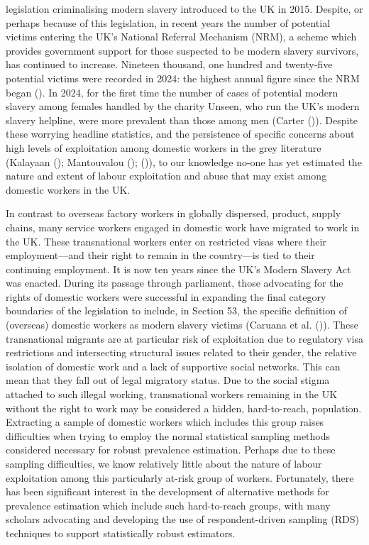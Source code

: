 \documentclass[
  12pt,
]{article}
\theoremstyle{plain}
\theoremstyle{definition}
\begin{document}
legislation criminalising modern slavery introduced to the UK in 2015.
Despite, or perhaps because of this legislation, in recent years the
number of potential victims entering the UK's National Referral
Mechanism (NRM), a scheme which provides government support for those
suspected to be modern slavery survivors, has continued to increase.
Nineteen thousand, one hundred and twenty-five potential victims were
recorded in 2024: the highest annual figure since the NRM began
(). In 2024, for the
first time the number of cases of potential modern slavery among females
handled by the charity Unseen, who run the UK's modern slavery helpline,
were more prevalent than those among men (Carter
()). Despite these worrying
headline statistics, and the persistence of specific concerns about high
levels of exploitation among domestic workers in the grey literature
(Kalayaan (); Mantouvalou
();
()), to our knowledge
no-one has yet estimated the nature and extent of labour exploitation
and abuse that may exist among domestic workers in the UK.

In contrast to overseas factory workers in globally dispersed, product,
supply chains, many service workers engaged in domestic work have
migrated to work in the UK. These transnational workers enter on
restricted visas where their employment---and their right to remain in
the country---is tied to their continuing employment. It is now ten
years since the UK's Modern Slavery Act was enacted. During its passage
through parliament, those advocating for the rights of domestic workers
were successful in expanding the final category boundaries of the
legislation to include, in Section 53, the specific definition of
(overseas) domestic workers as modern slavery victims (Caruana et al.
()). These transnational
migrants are at particular risk of exploitation due to regulatory visa
restrictions and intersecting structural issues related to their gender,
the relative isolation of domestic work and a lack of supportive social
networks. This can mean that they fall out of legal migratory status.
Due to the social stigma attached to such illegal working, transnational
workers remaining in the UK without the right to work may be considered
a hidden, hard-to-reach, population. Extracting a sample of domestic
workers which includes this group raises difficulties when trying to
employ the normal statistical sampling methods considered necessary for
robust prevalence estimation. Perhaps due to these sampling
difficulties, we know relatively little about the nature of labour
exploitation among this particularly at-risk group of workers.
Fortunately, there has been significant interest in the development of
alternative methods for prevalence estimation which include such
hard-to-reach groups, with many scholars advocating and developing the
use of respondent-driven sampling (RDS) techniques to support
statistically robust estimators.
\end{document}
